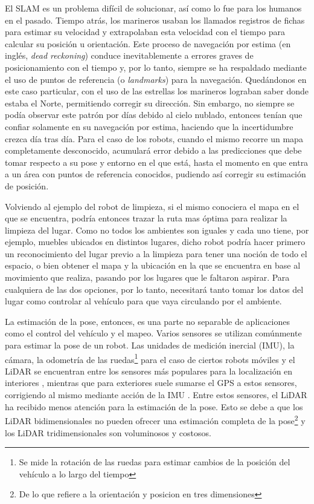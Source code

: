 El SLAM es un problema difícil de solucionar, así como lo fue para los humanos en el pasado. Tiempo atrás, los marineros usaban los llamados registros de fichas para estimar su velocidad y extrapolaban esta velocidad con el tiempo para calcular su posición u orientación. Este proceso de navegación por estima (en inglés, \textit{dead reckoning}) conduce inevitablemente a errores graves de posicionamiento con el tiempo y, por lo tanto, siempre se ha respaldado mediante el uso de puntos de referencia (o \textit{landmarks}) para la navegación. Quedándonos en este caso particular, con el uso de las estrellas los marineros lograban saber donde estaba el Norte, permitiendo corregir su dirección. Sin embargo, no siempre se podía observar este patrón por días debido al cielo nublado, entonces tenían que confiar solamente en su navegación por estima, haciendo que la incertidumbre crezca día tras día. Para el caso de los robots, cuando el mismo recorre un  mapa completamente desconocido, acumulará error debido a las predicciones que debe tomar respecto a su pose y entorno en el que está, hasta el momento en que entra a un área con puntos de referencia conocidos, pudiendo así corregir su estimación de posición.

Volviendo al ejemplo del robot de limpieza, si el mismo conociera el mapa en el que se encuentra, podría entonces trazar la ruta mas óptima para realizar la limpieza del lugar. Como no todos los ambientes son iguales y cada uno tiene, por ejemplo, muebles ubicados en distintos lugares, dicho robot podría hacer primero un reconocimiento del lugar previo a la limpieza para tener una noción de todo el espacio, o bien obtener el mapa y la ubicación en la que se encuentra en base al movimiento que realiza, pasando por los lugares que le faltaron aspirar. Para cualquiera de las dos opciones, por lo tanto, necesitará tanto tomar los datos del lugar como controlar al vehículo para que vaya circulando por el ambiente.

La estimación de la pose, entonces, es una parte no separable de aplicaciones como el control del vehículo y el mapeo. Varios sensores se utilizan comúnmente para estimar la pose de un robot. Las unidades de medición inercial (IMU), la cámara, la odometría de las ruedas\footnote{Se mide la rotación de las ruedas para estimar cambios de la posición del vehículo a lo largo del tiempo} para el caso de ciertos robots móviles  y el LiDAR se encuentran entre los sensores más populares para la localización en interiores \cite{delrosario2016}, mientras que para exteriores suele sumarse el GPS a estos sensores, corrigiendo al mismo mediante acción de la IMU \cite{caron2006}. Entre estos sensores, el LiDAR ha recibido menos atención para la estimación de la pose. Esto se debe a que los LiDAR bidimensionales no pueden ofrecer una estimación completa de la pose\footnote{De lo que refiere a la orientación y posicion en tres dimensiones} y los LiDAR tridimensionales son voluminosos y costosos.

